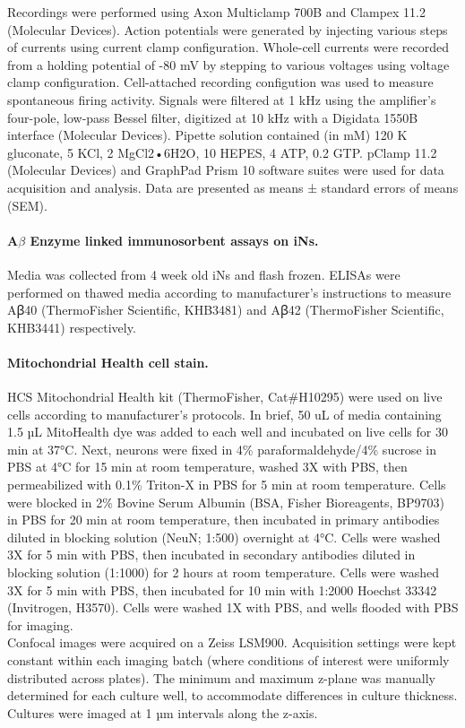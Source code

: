 \documentclass[12pt]{article}
\begin{document}
Recordings were performed using Axon Multiclamp 700B and Clampex 11.2 (Molecular Devices). Action potentials were generated by injecting various steps of currents using current clamp configuration.  Whole-cell currents were recorded from a holding potential of -80 mV by stepping to various voltages using voltage clamp configuration. Cell-attached recording configution was used to measure spontaneous firing activity. Signals were filtered at 1 kHz using the amplifier’s four-pole, low-pass Bessel filter, digitized at 10 kHz with a Digidata 1550B interface (Molecular Devices). Pipette solution contained (in mM) 120 K gluconate, 5 KCl, 2 MgCl2•6H2O, 10 HEPES, 4 ATP, 0.2 GTP. pClamp 11.2 (Molecular Devices) and GraphPad Prism 10 software suites were used for data acquisition and analysis. Data are presented as means ± standard errors of means (SEM).

\paragraph{A$\beta$ Enzyme linked immunosorbent assays on iNs.}
Media was collected from 4 week old iNs and flash frozen. ELISAs were performed on thawed media according to manufacturer’s instructions to measure Aꞵ40 (ThermoFisher Scientific, KHB3481) and Aꞵ42 (ThermoFisher Scientific, KHB3441) respectively.

\paragraph{Mitochondrial Health cell stain.}
HCS Mitochondrial Health kit (ThermoFisher, Cat\#H10295) were used on live cells according to manufacturer’s protocols. In brief, 50 uL of media containing 1.5 µL MitoHealth dye was added to each well and incubated on live cells for 30 min at 37°C. Next, neurons were fixed in 4\% paraformaldehyde/4\% sucrose in PBS at 4°C for 15 min at room temperature, washed 3X with PBS, then permeabilized with 0.1\% Triton-X in PBS for 5 min at room temperature. Cells were blocked in 2\% Bovine Serum Albumin (BSA, Fisher Bioreagents, BP9703) in PBS for 20 min at room temperature, then incubated in primary antibodies diluted in blocking solution (NeuN; 1:500) overnight at 4°C. Cells were washed 3X for 5 min with PBS, then incubated in secondary antibodies diluted in blocking solution (1:1000) for 2 hours at room temperature. Cells were washed 3X for 5 min with PBS, then incubated for 10 min with 1:2000 Hoechst 33342 (Invitrogen, H3570). Cells were washed 1X with PBS, and wells flooded with PBS for imaging.\\
Confocal images were acquired on a Zeiss LSM900. Acquisition settings were kept constant within each imaging batch (where conditions of interest were uniformly distributed across plates). The minimum and maximum z-plane was manually determined for each culture well, to accommodate differences in culture thickness. Cultures were imaged at 1 µm intervals along the z-axis.
\end{document}
